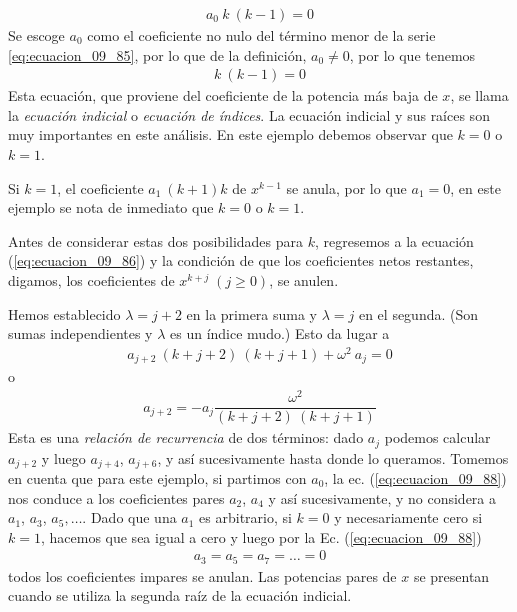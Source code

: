 \begin{align*}
a_{0} \: k \: (k - 1) = 0
\end{align*}
Se escoge $a_{0}$ como el coeficiente no nulo del término menor de la serie \ref{eq:ecuacion_09_85}, por lo que de la definición, $a_{0} \neq 0$, por lo que tenemos
\begin{align}
 k \: (k - 1) = 0
\label{eq:ecuacion_09_87}
\end{align}
Esta ecuación, que proviene del coeficiente de la potencia más baja de $x$, se llama la \emph{ecuación indicial} o \emph{ecuación de índices}. La ecuación indicial y sus raíces son muy importantes en este análisis. En este ejemplo debemos observar que $k = 0$ o $k = 1$.
\par
Si $k = 1$, el coeficiente $a_{1} \: (k + 1)k$ de $x^{k - 1}$ se anula, por lo que $a_{1} = 0$, en este ejemplo se nota de inmediato que $k = 0$ o $k = 1$.
\par
Antes de considerar estas dos posibilidades para $k$, regresemos a la ecuación (\ref{eq:ecuacion_09_86}) y la condición de que los coeficientes netos restantes, digamos, los coeficientes de $x^{k + j} \; (j \geq 0)$, se anulen.
\par
Hemos establecido $ \lambda = j + 2$ en la primera suma y $\lambda = j$ en el segunda. (Son sumas independientes y $\lambda$ es un índice mudo.) Esto da lugar a
\begin{align*}
a_{j + 2} \: (k + j + 2) \: (k + j + 1) + \omega^{2} \: a_{j} = 0
\end{align*}
o
\begin{align}
a_{j + 2} = - a_{j} \dfrac{\omega^{2}}{(k + j + 2) \: (k + j + 1)}
\label{eq:ecuacion_09_88}
\end{align}
Esta es una \emph{relación de recurrencia} de dos términos: dado $a_{j}$ podemos calcular $a_{j + 2}$ y luego $a_{j + 4}$, $a_{j + 6}$, y así sucesivamente hasta donde lo queramos. Tomemos en cuenta que para este ejemplo, si partimos con $a_{0}$, la ec. (\ref{eq:ecuacion_09_88}) nos conduce a los coeficientes pares $a_{2}$, $a_{4}$ y así sucesivamente, y no considera a $a_{1}$, $a_{3}$, $a_{5}, \ldots$. Dado que una $a_{1}$ es arbitrario, si $k = 0$ y necesariamente cero si $k = 1$, hacemos que sea igual a cero  y luego por la Ec. (\ref{eq:ecuacion_09_88})
\begin{align*}
a_{3} = a_{5} = a_{7} = \ldots = 0
\end{align*}
todos los coeficientes impares se anulan. Las potencias pares de $x$ se presentan cuando se utiliza la segunda raíz de la ecuación indicial.
